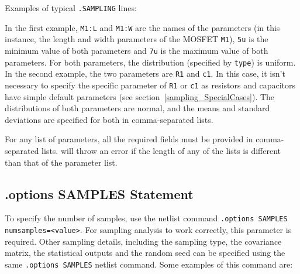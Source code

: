 Examples of typical \verb|.SAMPLING| lines:


In the first example, \verb|M1:L| and \verb|M1:W| 
are the names of the
parameters (in this instance, the length and width parameters of the MOSFET
\texttt{M1}), \verb|5u| is the minimum value of both parameters and
\verb|7u| is the maximum value of both parameters.  For both parameters, 
the distribution (specified by \texttt{type}) is uniform.
In the second example, the two parameters are \verb|R1| and \verb|c1|.   In this 
case, it isn't necessary to specify the specific parameter of \verb|R1| or \verb|c1| 
as resistors and capacitors have simple default parameters (see section~\ref{sampling_SpecialCases}).  
The distributions of both parameters are normal, and the means and standard deviations 
are specified for both in comma-separated lists.

For any list of parameters, all the required fields must be provided in comma-separated 
lists.  \Xyce{} will throw an error if the length of any of the lists is different 
than that of the parameter list.

\subsection{.options SAMPLES Statement}
\label{options_samples_statement}

To specify the number of samples, use the netlist command \texttt{.options 
SAMPLES numsamples=<value>}.   For sampling analysis to work correctly, this parameter is required.
Other sampling details, including the sampling type, the covariance matrix, 
the statistical outputs and the random seed can be specified using the 
same \verb|.options SAMPLES| netlist command.  Some examples of this command are:


